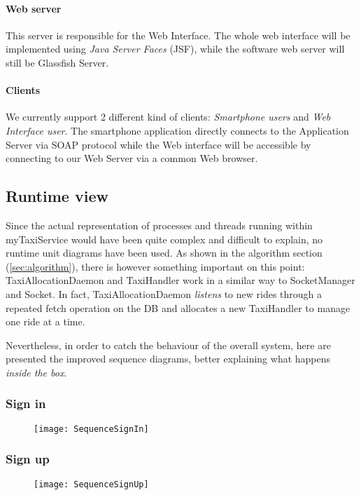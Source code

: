 \paragraph{Web server} This server is responsible for the Web Interface.
The whole web interface will be implemented using \emph{Java Server Faces} (JSF), while 
the software web server will still be Glassfish Server.

\paragraph{Clients}
We currently support 2 different kind of clients: \emph{Smartphone users} and 
\emph{Web Interface user}.
The smartphone application directly connects to the Application Server via SOAP protocol
while the Web interface will be accessible by connecting to our Web Server via
a common Web browser.


\newpage
\subsection{Runtime view}
Since the actual representation of processes and threads running within myTaxiService would have been quite complex and difficult to explain, no runtime unit diagrams have been used. As shown in the algorithm section (\ref{sec:algorithm}), there is however something important on this point: TaxiAllocationDaemon and TaxiHandler work in a similar way to SocketManager and Socket. In fact, TaxiAllocationDaemon \emph{listens} to new rides through a repeated fetch operation on the DB and allocates a new TaxiHandler to manage one ride at a time.

Nevertheless, in order to catch the behaviour of the overall system, here are presented the improved sequence diagrams, better explaining what happens \emph{inside the box}.

\newpage
\subsubsection{Sign in} %
\begin{figure}[h!]
    \centering
    \texttt{[image: SequenceSignIn]}
\end{figure}

\newpage
\subsubsection{Sign up} %
\begin{figure}[h!]
    \centering
    \texttt{[image: SequenceSignUp]}
\end{figure}

